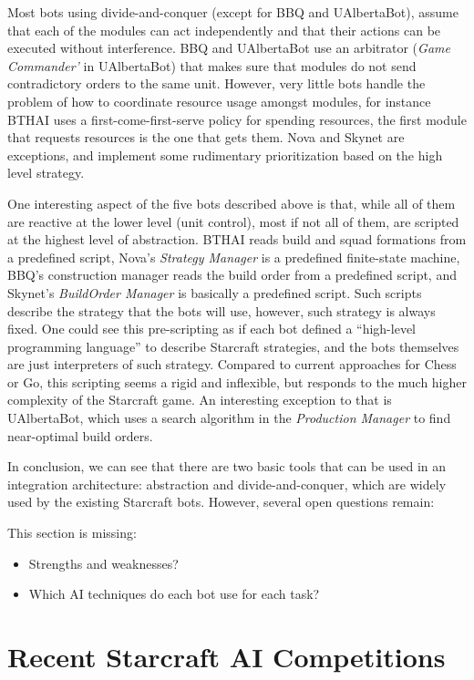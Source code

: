 \documentclass[journal]{IEEEtran}
\begin{document}
Most bots using divide-and-conquer (except for BBQ and UAlbertaBot), assume that each of the modules can act independently and that their actions can be executed without interference. BBQ and UAlbertaBot use an arbitrator ({\em Game Commander'} in UAlbertaBot) that makes sure that modules do not send contradictory orders to the same unit. However, very little bots handle the problem of how to coordinate resource usage amongst modules, for instance BTHAI uses a first-come-first-serve policy for spending resources, the first module that requests resources is the one that gets them. Nova and Skynet are exceptions, and implement some rudimentary prioritization based on the high level strategy.

One interesting aspect of the five bots described above is that, while all of them are reactive at the lower level (unit control), most if not all of them, are scripted at the highest level of abstraction. BTHAI reads build and squad formations from a predefined script, Nova's {\em Strategy Manager} is a predefined finite-state machine, BBQ's construction manager reads the build order from a predefined script, and Skynet's {\em BuildOrder Manager} is basically a predefined script. Such scripts describe the strategy that the bots will use, however, such strategy is always fixed. One could see this pre-scripting as if each bot defined a ``high-level programming language'' to describe Starcraft strategies, and the bots themselves are just interpreters of such strategy. Compared to current approaches for Chess or Go, this scripting seems a rigid and inflexible, but responds to the much higher complexity of the Starcraft game. An interesting exception to that is UAlbertaBot, which uses a search algorithm in the {\em Production Manager} to find near-optimal build orders. 

In conclusion, we can see that there are two basic tools that can be used in an integration architecture: abstraction and divide-and-conquer, which are widely used by the existing Starcraft bots. However, several open questions remain:

{\color{red}
This section is missing:
\begin{itemize}
\item Strengths and weaknesses?
\item Which AI techniques do each bot use for each task?
\end{itemize}
}


\section{Recent Starcraft AI Competitions}\label{sec:competition}
\end{document}
